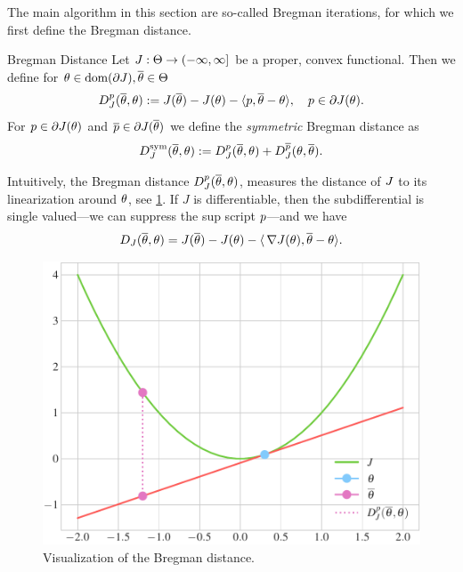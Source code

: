 The main algorithm in this section are so-called Bregman iterations, for which we first define the Bregman distance.
%
\begin{definition}{Bregman Distance}{}
Let $J:\Theta\to(-\infty,\infty]$ be a proper, convex functional. Then we define for $\theta\in\operatorname{dom}(\partial J),\overline{\theta}\in\Theta$
\begin{align}\label{eq:bregman_distance}
D^p_J(\overline{\theta},\theta) := J(\overline {\theta})-J({\theta})-\langle p,\overline{\theta}-{\theta}\rangle,\quad p\in\partial J(\theta).
\end{align}
%
For $p\in\partial J({\theta})$ and $\overline{p}\in\partial J(\overline{\theta})$ we define the \emph{symmetric} Bregman distance as
\begin{align}
D^\mathrm{sym}_J(\overline{\theta},\theta) := D^p_J(\overline{\theta},\theta) + D^{\overline{p}}_J(\theta,\overline{\theta}).
\end{align}
\end{definition}
Intuitively, the Bregman distance $D^p_J(\overline{\theta},\theta)$, measures the distance of $J$ to its linearization around $\theta$, see \cref{fig:Bregdist}. If $J$ is differentiable, then the subdifferential is single valued---we can suppress the sup script $p$---and we have
%
\begin{align*}
D_J(\overline{\theta},\theta) = J(\overline {\theta})-J({\theta})-\langle\,\nabla J(\theta), \overline{\theta}-{\theta}\rangle.
\end{align*}
%
\begin{figure}
\centering
\includegraphics[width=.7\textwidth]{code/Bregman/lin_dist.pdf}
\caption{Visualization of the Bregman distance.}\label{fig:Bregdist}
\end{figure}
